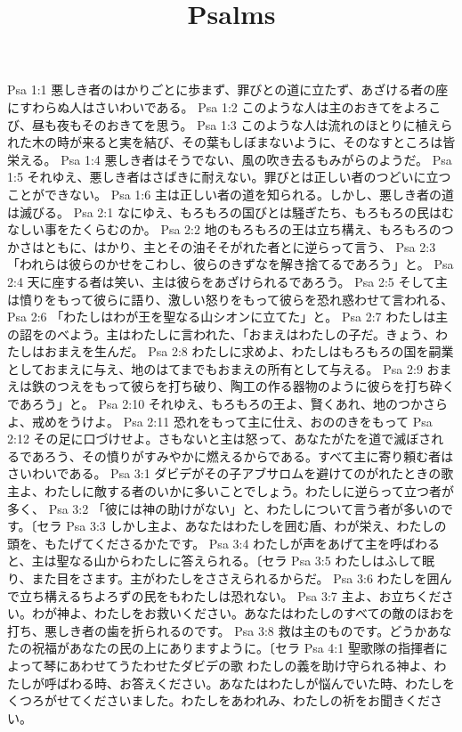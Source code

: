 

\title{Psalms}

Psa 1:1  悪しき者のはかりごとに歩まず、罪びとの道に立たず、あざける者の座にすわらぬ人はさいわいである。
Psa 1:2  このような人は主のおきてをよろこび、昼も夜もそのおきてを思う。
Psa 1:3  このような人は流れのほとりに植えられた木の時が来ると実を結び、その葉もしぼまないように、そのなすところは皆栄える。
Psa 1:4  悪しき者はそうでない、風の吹き去るもみがらのようだ。
Psa 1:5  それゆえ、悪しき者はさばきに耐えない。罪びとは正しい者のつどいに立つことができない。
Psa 1:6  主は正しい者の道を知られる。しかし、悪しき者の道は滅びる。
Psa 2:1  なにゆえ、もろもろの国びとは騒ぎたち、もろもろの民はむなしい事をたくらむのか。
Psa 2:2  地のもろもろの王は立ち構え、もろもろのつかさはともに、はかり、主とその油そそがれた者とに逆らって言う、
Psa 2:3  「われらは彼らのかせをこわし、彼らのきずなを解き捨てるであろう」と。
Psa 2:4  天に座する者は笑い、主は彼らをあざけられるであろう。
Psa 2:5  そして主は憤りをもって彼らに語り、激しい怒りをもって彼らを恐れ惑わせて言われる、
Psa 2:6  「わたしはわが王を聖なる山シオンに立てた」と。
Psa 2:7  わたしは主の詔をのべよう。主はわたしに言われた、「おまえはわたしの子だ。きょう、わたしはおまえを生んだ。
Psa 2:8  わたしに求めよ、わたしはもろもろの国を嗣業としておまえに与え、地のはてまでもおまえの所有として与える。
Psa 2:9  おまえは鉄のつえをもって彼らを打ち破り、陶工の作る器物のように彼らを打ち砕くであろう」と。
Psa 2:10  それゆえ、もろもろの王よ、賢くあれ、地のつかさらよ、戒めをうけよ。
Psa 2:11  恐れをもって主に仕え、おののきをもって
Psa 2:12  その足に口づけせよ。さもないと主は怒って、あなたがたを道で滅ぼされるであろう、その憤りがすみやかに燃えるからである。すべて主に寄り頼む者はさいわいである。
Psa 3:1  ダビデがその子アブサロムを避けてのがれたときの歌 主よ、わたしに敵する者のいかに多いことでしょう。わたしに逆らって立つ者が多く、
Psa 3:2  「彼には神の助けがない」と、わたしについて言う者が多いのです。〔セラ
Psa 3:3  しかし主よ、あなたはわたしを囲む盾、わが栄え、わたしの頭を、もたげてくださるかたです。
Psa 3:4  わたしが声をあげて主を呼ばわると、主は聖なる山からわたしに答えられる。〔セラ
Psa 3:5  わたしはふして眠り、また目をさます。主がわたしをささえられるからだ。
Psa 3:6  わたしを囲んで立ち構えるちよろずの民をもわたしは恐れない。
Psa 3:7  主よ、お立ちください。わが神よ、わたしをお救いください。あなたはわたしのすべての敵のほおを打ち、悪しき者の歯を折られるのです。
Psa 3:8  救は主のものです。どうかあなたの祝福があなたの民の上にありますように。〔セラ
Psa 4:1  聖歌隊の指揮者によって琴にあわせてうたわせたダビデの歌 わたしの義を助け守られる神よ、わたしが呼ばわる時、お答えください。あなたはわたしが悩んでいた時、わたしをくつろがせてくださいました。わたしをあわれみ、わたしの祈をお聞きください。
